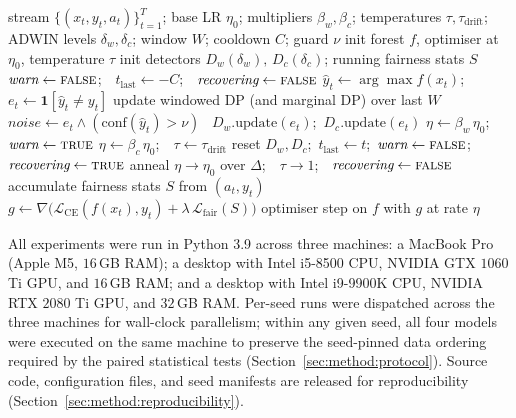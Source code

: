 \documentclass[sigconf,anonymous,review]{acmart}
\begin{document}
\begin{algorithm}[t]
\caption{\textsc{FADO} prequential test-then-train loop}
\label{alg:fado}
\begin{algorithmic}[1]
\Require stream $\{(x_t,y_t,a_t)\}_{t=1}^{T}$; base LR $\eta_0$; multipliers $\beta_w,\beta_c$; temperatures $\tau,\tau_{\mathrm{drift}}$; ADWIN levels $\delta_w,\delta_c$; window $W$; cooldown $C$; guard $\nu$
\State init forest $f$, optimiser at $\eta_0$, temperature $\tau$
\State init detectors $D_w(\delta_w),\,D_c(\delta_c)$; running fairness stats $S$
\State $\textit{warn}\gets\textsc{false}$;\ \ $t_{\text{last}}\gets-C$;\ \ $\textit{recovering}\gets\textsc{false}$
  \State $\hat{y}_t \gets \arg\max f(x_t)$;\ \ $e_t \gets \mathbf{1}[\hat{y}_t \neq y_t]$ 
  \State update windowed DP (and marginal DP) over last $W$
  \State $\textit{noise} \gets e_t \wedge (\text{conf}(\hat{y}_t) > \nu)$ 
  \ $D_w.\textrm{update}(e_t)$;\ $D_c.\textrm{update}(e_t)$ \EndIf
     \State $\eta \gets \beta_w\,\eta_0$;\ \ $\textit{warn}\gets\textsc{true}$ 
  \EndIf
     \State $\eta \gets \beta_c\,\eta_0$;\ \ $\tau \gets \tau_{\mathrm{drift}}$ 
     \State reset $D_w,D_c$;\ $t_{\text{last}}\gets t$;\ $\textit{warn}\gets\textsc{false}$;\ $\textit{recovering}\gets\textsc{true}$
  \EndIf
     \State anneal $\eta\!\to\!\eta_0$ over $\Delta$;\ \ $\tau\!\to\!1$;\ \ $\textit{recovering}\gets\textsc{false}$
  \EndIf
  \State accumulate fairness stats $S$ from $(a_t,y_t)$ 
  \State $g \gets \nabla\!\big(\mathcal{L}_{\mathrm{CE}}(f(x_t),y_t) + \lambda\,\mathcal{L}_{\mathrm{fair}}(S)\big)$
  \State optimiser step on $f$ with $g$ at rate $\eta$
\EndFor
\end{algorithmic}
\end{algorithm}

All experiments were run in Python 3.9 across three machines: a MacBook Pro (Apple M5, $16$\,GB RAM); a desktop with Intel i5-8500 CPU, NVIDIA GTX $1060$ Ti GPU, and $16$\,GB RAM; and a desktop with Intel i9-9900K CPU, NVIDIA RTX $2080$ Ti GPU, and $32$\,GB RAM. Per-seed runs were dispatched across the three machines for wall-clock parallelism; within any given seed, all four models were executed on the same machine to preserve the seed-pinned data ordering required by the paired statistical tests (Section~\ref{sec:method:protocol}). Source code, configuration files, and seed manifests are released for reproducibility (Section~\ref{sec:method:reproducibility}).
\end{document}
